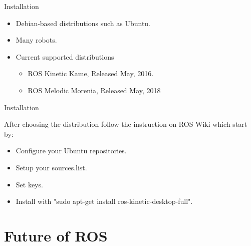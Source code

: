 \documentclass{beamer}
\begin{document}
\begin{frame}{Installation}

\begin{itemize}
\item Debian-based distributions such as Ubuntu.
\item Many robots.
\item Current supported distributions
\begin{itemize}
\item ROS Kinetic Kame, Released May, 2016.
\item ROS Melodic Morenia, Released May, 2018
\end{itemize}
\end{itemize}

\end{frame}
\begin{frame}{Installation}

After choosing the distribution follow the instruction on ROS Wiki which start by:
\begin{itemize}
\item Configure your Ubuntu repositories.
\item Setup your sources.list.
\item Set keys.
\item Install with "sudo apt-get install ros-kinetic-desktop-full".
\end{itemize}

\end{frame}


\section{Future of ROS}
\end{document}
